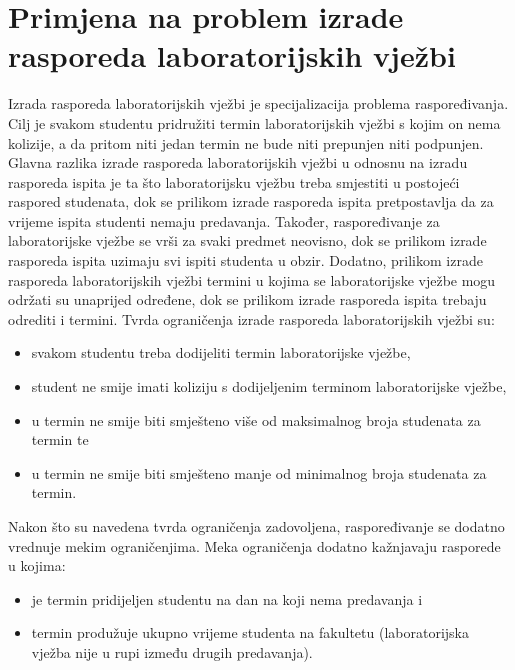\documentclass[times, utf8, zavrsni]{fer}
\begin{document}
\chapter{Primjena na problem izrade rasporeda laboratorijskih vježbi}
Izrada rasporeda laboratorijskih vježbi je specijalizacija problema raspoređivanja. Cilj je svakom studentu pridružiti termin laboratorijskih
vježbi s kojim on nema kolizije, a da pritom niti jedan termin ne bude niti prepunjen niti podpunjen. Glavna razlika izrade rasporeda laboratorijskih
vježbi u odnosnu na izradu rasporeda ispita je ta što laboratorijsku vježbu treba smjestiti u postojeći raspored studenata, dok se prilikom
izrade rasporeda ispita pretpostavlja da za vrijeme ispita studenti nemaju predavanja. Također, raspoređivanje za laboratorijske vježbe se
vrši za svaki predmet neovisno, dok se prilikom izrade rasporeda ispita uzimaju svi ispiti studenta u obzir. Dodatno, prilikom izrade rasporeda
laboratorijskih vježbi termini u kojima se laboratorijske vježbe mogu održati su unaprijed određene, dok se prilikom izrade rasporeda ispita
trebaju odrediti i termini.
Tvrda ograničenja izrade rasporeda laboratorijskih vježbi su:
\begin{itemize}
  \item svakom studentu treba dodijeliti termin laboratorijske vježbe,
  \item student ne smije imati koliziju s dodijeljenim terminom laboratorijske vježbe,
  \item u termin ne smije biti smješteno više od maksimalnog broja studenata za termin te
  \item u termin ne smije biti smješteno manje od minimalnog broja studenata za termin.
\end{itemize}
Nakon što su navedena tvrda ograničenja zadovoljena, raspoređivanje se dodatno vrednuje mekim ograničenjima. Meka ograničenja dodatno kažnjavaju
rasporede u kojima:
\begin{itemize}
  \item je termin pridijeljen studentu na dan na koji nema predavanja i
  \item termin produžuje ukupno vrijeme studenta na fakultetu (laboratorijska vježba nije u rupi između drugih predavanja).
\end{itemize}
\end{document}
